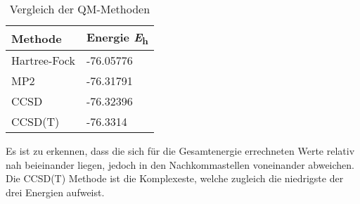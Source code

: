 \documentclass[12pt]{article}
\begin{document}
\begin{onehalfspace}
\begin{table}[!htpb]
\centering
\caption{ Vergleich der QM-Methoden}
\begin{tabular}{ll}
\toprule
Methode &   Energie \si{\hartree} \\
\midrule
Hartree-Fock & -76.05776\\
MP2 & -76.31791\\
CCSD & -76.32396 \\
CCSD(T) & -76.3314\\
\bottomrule
\end{tabular}
\end{table}
\noindent
Es ist zu erkennen, dass die sich für die Gesamtenergie errechneten Werte relativ nah beieinander liegen, jedoch in den Nachkommastellen voneinander abweichen. Die CCSD(T) Methode ist die Komplexeste, welche zugleich die niedrigste der drei Energien aufweist. 


\end{onehalfspace}
\end{document}
